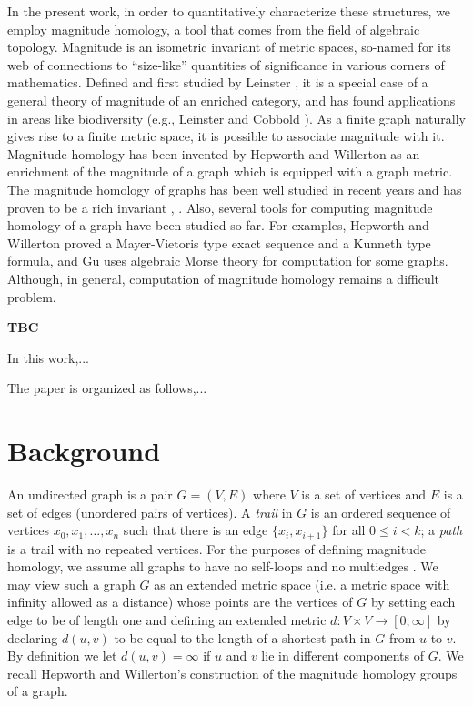 \documentclass[runningheads]{llncs}
\begin{document}
In the present work, in order to quantitatively characterize these structures, we employ magnitude homology, a tool that comes from the field of algebraic topology.
Magnitude is an isometric invariant of metric spaces, so-named for its web of connections to ``size-like'' quantities of significance in various corners of mathematics.
Defined and first studied by Leinster \cite{leinster2013magnitude}, it is a special case of a general theory of magnitude of an enriched category, and has found applications in areas like biodiversity (e.g., Leinster and Cobbold \cite{leinster2012measuring}).
As a finite graph naturally gives rise to a finite metric space, it is possible to associate magnitude with it.
Magnitude homology has been invented by Hepworth and Willerton \cite{hepworth2015categorifying} as an enrichment of the magnitude of a graph which is equipped with a graph metric.
The magnitude homology of graphs has been well studied in recent years and has proven to be a rich invariant \cite{hepworth2015categorifying} \cite{gu2018graph}, \cite{sazdanovic2021torsion}.
Also, several tools for computing magnitude homology of a graph have been studied so far. 
For examples, Hepworth and Willerton proved a Mayer-Vietoris type exact sequence and a Kunneth type formula, and Gu \cite{gu2018graph} uses algebraic Morse theory for computation for some graphs. 
Although, in general, computation of magnitude homology remains a difficult problem.

\textbf{TBC}

In this work,...

The paper is organized as follows,...

\section{Background}

An undirected graph is a pair $G=(V,E)$ where $V$ is a set of vertices and $E$ is a set of edges (unordered pairs of vertices). A \emph{trail} in $G$ is an ordered sequence of vertices $x_0,x_1,\ldots,x_n$ such that there is an edge $\{x_i,x_{i+1}\}$ for all $0\leq i<k$; a \emph{path} is a trail with no repeated vertices.
For the purposes of defining magnitude homology, we assume all graphs to have no self-loops and no multiedges \cite{leinster2019magnitude}.
We may view such a graph $G$ as an extended metric space (i.e. a metric space with infinity allowed as a distance) whose points are the vertices of $G$ by setting each edge to be of length one and defining an extended metric $d:V \times V \to [0,\infty]$ by declaring $d(u,v)$ to be equal to the length of a shortest path in $G$ from $u$ to $v$.
By definition we let $d(u,v) = \infty$ if $u$ and $v$ lie in different components of $G$.
%
We recall Hepworth and Willerton's construction \cite{hepworth2015categorifying} of the magnitude homology groups of a graph.
\end{document}
